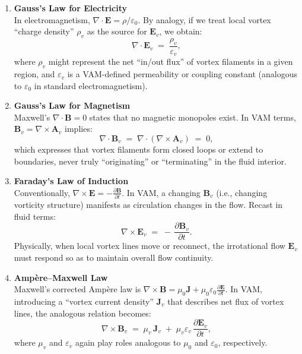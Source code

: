 \documentclass[aps,preprint,superscriptaddress]{revtex4-2}
\begin{document}
    \begin{enumerate}
        \item \textbf{Gauss’s Law for Electricity} \\
    In electromagnetism, \(\nabla \cdot \mathbf{E} = \rho / \varepsilon_0\). By analogy, if we treat local vortex “charge density” \(\rho_{v}\) as the source for \(\mathbf{E}_v\), we obtain:
    \[
        \nabla \cdot \mathbf{E}_v \;=\;
        \frac{\rho_{v}}{\varepsilon_v},
    \]
    where \(\rho_{v}\) might represent the net “in/out flux” of vortex filaments in a given region, and \(\varepsilon_v\) is a VAM-defined permeability or coupling constant (analogous to \(\varepsilon_0\) in standard electromagnetism).

        \item \textbf{Gauss’s Law for Magnetism} \\
    Maxwell’s \(\nabla \cdot \mathbf{B} = 0\) states that no magnetic monopoles exist. In VAM terms, \(\mathbf{B}_v = \nabla \times \mathbf{A}_v\) implies:
    \[
        \nabla \cdot \mathbf{B}_v
        \;=\;
        \nabla \cdot (\nabla \times \mathbf{A}_v)
        \;=\;
        0,
    \]
    which expresses that vortex filaments form closed loops or extend to boundaries, never truly “originating” or “terminating” in the fluid interior.

        \item \textbf{Faraday’s Law of Induction} \\
    Conventionally, \(\nabla \times \mathbf{E} = - \tfrac{\partial \mathbf{B}}{\partial t}\). In VAM, a changing \(\mathbf{B}_v\) (i.e., changing vorticity structure) manifests as circulation changes in the flow. Recast in fluid terms:
    \[
        \nabla \times \mathbf{E}_v
        \;=\;
        -\,\frac{\partial \mathbf{B}_v}{\partial t}.
    \]
    Physically, when local vortex lines move or reconnect, the irrotational flow \(\mathbf{E}_v\) must respond so as to maintain overall flow continuity.

        \item \textbf{Ampère–Maxwell Law} \\
    Maxwell’s corrected Ampère law is \(\nabla \times \mathbf{B} = \mu_0 \mathbf{J} + \mu_0 \varepsilon_0 \tfrac{\partial \mathbf{E}}{\partial t}\). In VAM, introducing a “vortex current density” \(\mathbf{J}_v\) that describes net flux of vortex lines, the analogous relation becomes:
    \[
        \nabla \times \mathbf{B}_v
        \;=\;
        \mu_v\,\mathbf{J}_v
        \;+\;
        \mu_v \varepsilon_v \,\frac{\partial \mathbf{E}_v}{\partial t},
    \]
    where \(\mu_v\) and \(\varepsilon_v\) again play roles analogous to \(\mu_0\) and \(\varepsilon_0\), respectively.
    \end{enumerate}
\end{document}
